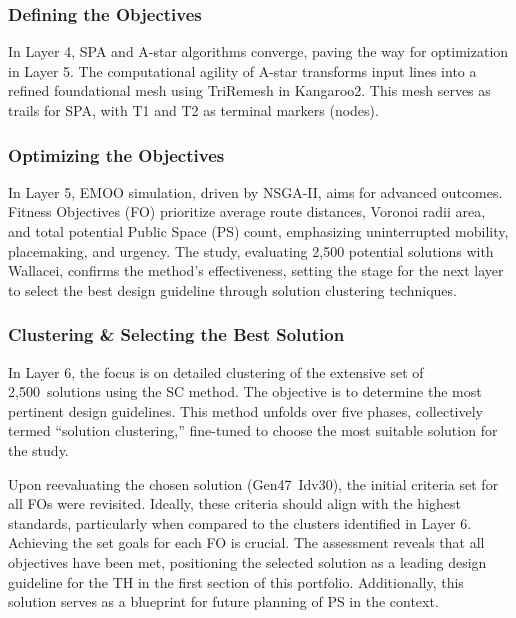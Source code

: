 \subsubsection*{Defining the Objectives}
\vspace*{-\baselineskip}%

In Layer 4, SPA and A-star algorithms converge, paving the way for optimization in Layer 5. The computational agility of A-star transforms input lines into a refined foundational mesh using TriRemesh in Kangaroo2. This mesh serves as trails for SPA, with T1 and T2 as terminal markers (nodes).
\vfill
\subsubsection*{Optimizing the Objectives}
\vspace*{-\baselineskip}%
\setlength{\columnsep}{0.25cm}%
\begin{multicols}{2}
	
	
\end{multicols}
\vfill

In Layer 5, EMOO simulation, driven by NSGA-II, aims for advanced outcomes. Fitness Objectives (FO) prioritize average route distances, Voronoi radii area, and total potential Public Space (PS) count, emphasizing uninterrupted mobility, placemaking, and urgency. The study, evaluating 2,500 potential solutions with Wallacei, confirms the method's effectiveness, setting the stage for the next layer to select the best design guideline through solution clustering techniques.
\columnbreak%
\subsubsection*{Clustering \& Selecting the Best Solution}

In Layer 6, the focus is on detailed clustering of the extensive set of 2,500~solutions using the SC method. The objective is to determine the most pertinent design guidelines. This method unfolds over five phases, collectively termed ``solution clustering,'' fine-tuned to choose the most suitable solution for the study.
\vfill

Upon reevaluating the chosen solution (Gen47~Idv30), the initial criteria set for all FOs were revisited. Ideally, these criteria should align with the highest standards, particularly when compared to the clusters identified in Layer 6. Achieving the set goals for each FO is crucial. The assessment reveals that all objectives have been met, positioning the selected solution as a leading design guideline for the TH in the first section of this portfolio. Additionally, this solution serves as a blueprint for future planning of PS in the context.

